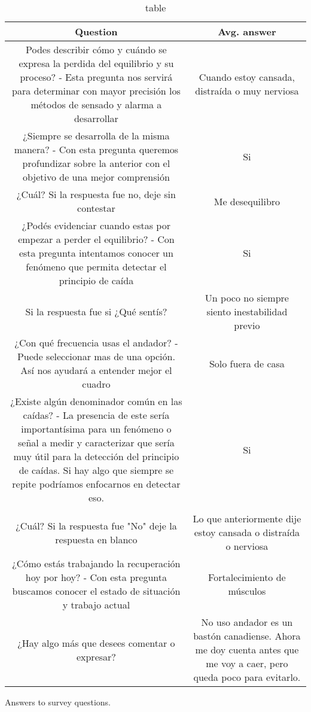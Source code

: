 \documentclass[conference]{IEEEtran}
\begin{document}
\begin{table*}[t]
\begin{center}
\begin{tabular}[!t]{|c|c|}
\hline
Question & Avg. answer \\
\hline
Podes describir cómo y cuándo se expresa la perdida del equilibrio y su proceso? - Esta pregunta nos servirá para determinar con mayor precisión los métodos de sensado y alarma a desarrollar  & Cuando estoy cansada, distraída o muy nerviosa\\
\hline
¿Siempre se desarrolla de la misma manera? - Con esta pregunta queremos profundizar sobre la anterior con el objetivo de una mejor comprensión &  Si \\
\hline
¿Cuál? Si la respuesta fue no, deje sin contestar  & Me desequilibro\\
\hline
¿Podés evidenciar cuando estas por empezar a perder el equilibrio? - Con esta pregunta intentamos conocer un fenómeno que permita detectar el principio de caída & Si \\
\hline
Si la respuesta fue si ¿Qué sentís? & Un poco no siempre siento inestabilidad previo  \\
\hline
¿Con qué frecuencia usas el andador? - Puede seleccionar mas de una opción. Así nos ayudará a entender mejor el cuadro & Solo fuera de casa \\
\hline
¿Existe algún denominador común en las caídas? - La presencia de este sería importantísima para  un fenómeno o señal a medir y caracterizar que sería muy útil para la detección del principio de caídas. Si hay algo que siempre se repite podríamos enfocarnos en detectar eso. & Si \\
\hline\\
¿Cuál? Si la respuesta fue "No" deje la respuesta en blanco & Lo que anteriormente dije estoy cansada o distraída o nerviosa  \\
\hline
¿Cómo estás trabajando la recuperación hoy por hoy? - Con esta pregunta buscamos conocer el estado de situación y trabajo actual & Fortalecimiento de músculos   \\
\hline
¿Hay algo más que desees comentar o expresar? & No uso andador es un bastón canadiense. 
Ahora me doy cuenta antes que me voy a caer, pero queda poco para evitarlo.   \\
\hline
\end{tabular}
\caption{table}{Answers to survey questions.}
\label{tab:alpi_q_table_1}
\end{center}
\end{table*}
\end{document}
